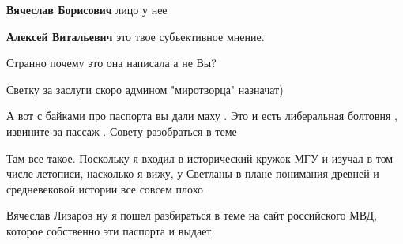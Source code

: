 \begin{itemize}
\begin{itemize}
\textbf{Вячеслав Борисович} лицо у нее

 
\textbf{Алексей Витальевич} \Laughey[1.0][white]\Laughey[1.0][white]\Laughey[1.0][white]это твое субъективное мнение.

 
Странно почему это она написала а не Вы?

 
Светку за заслуги скоро админом "миротворца" назначат)
\end{itemize}

 
А вот с байками про паспорта вы дали маху . Это и есть либеральная болтовня , извините за пассаж . Совету разобраться в теме

\begin{itemize}
 
Там все такое.
Поскольку я входил в исторический кружок МГУ и изучал в том числе летописи, насколько я вижу, у Светланы в плане понимания древней и средневековой истории все совсем плохо

 
Вячеслав Лизаров ну я пошел разбираться в теме на сайт российского МВД, которое собственно эти паспорта и выдает.


\end{itemize}
\end{itemize}
